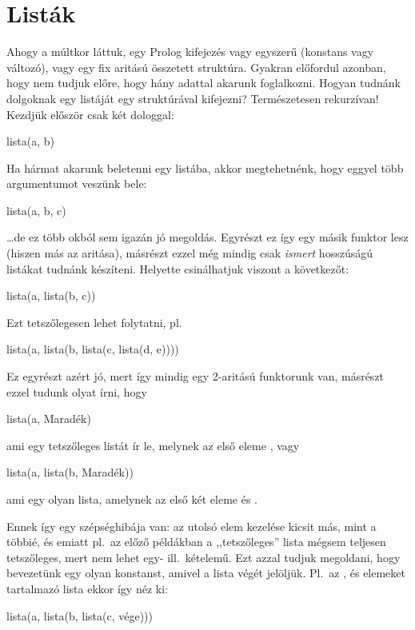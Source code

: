 \chapter{Listák}
Ahogy a múltkor láttuk, egy Prolog kifejezés vagy
egyszerű (konstans vagy változó), vagy egy fix
aritású összetett struktúra. Gyakran előfordul
azonban, hogy nem tudjuk előre, hogy hány adattal
akarunk foglalkozni. Hogyan tudnánk dolgoknak egy
listáját egy struktúrával kifejezni? Természetesen
rekurzívan! Kezdjük először csak két dologgal:
\begin{query}
lista(a, b)
\end{query}
Ha hármat akarunk beletenni egy listába, akkor
megtehetnénk, hogy eggyel több argumentumot veszünk
bele:
\begin{query}
lista(a, b, c)
\end{query}
\dots de ez több okból sem igazán jó
megoldás. Egyrészt ez így egy másik funktor lesz
(hiszen más az aritása), másrészt ezzel még mindig
csak \emph{ismert} hosszúságú listákat tudnánk
készíteni. Helyette csinálhatjuk viszont a
következőt:
\begin{query}
lista(a, lista(b, c))
\end{query}
Ezt tetszőlegesen lehet folytatni, pl.
\begin{query}
lista(a, lista(b, lista(c, lista(d, e))))
\end{query}
Ez egyrészt azért jó, mert így mindig egy 2-aritású
 funktorunk van, másrészt ezzel tudunk
olyat írni, hogy
\begin{query}
lista(a, Maradék)
\end{query}
ami egy tetszőleges listát ír le, melynek az első eleme
, vagy
\begin{query}
lista(a, lista(b, Maradék))
\end{query}
ami egy olyan lista, amelynek az első két
eleme  és .

Ennek így egy szépséghibája van: az utolsó elem
kezelése kicsit más, mint a többié, és emiatt pl.~az
előző példákban a ,,tetszőleges'' lista mégsem
teljesen tetszőleges, mert nem lehet egy-
ill.~kételemű. Ezt azzal tudjuk megoldani, hogy
bevezetünk egy olyan konstanst, amivel a lista végét
jelöljük. Pl.~az ,  és  elemeket
tartalmazó lista ekkor így néz ki:
\begin{query}
lista(a, lista(b, lista(c, vége)))
\end{query}

